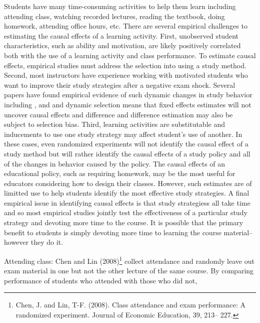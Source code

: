 \documentclass[12pt]{article}
\begin{document}
Students have many time-consuming activities to help them learn including attending class, watching recorded lectures, reading the textbook, doing homework, attending office hours, etc. There are several empirical challenges to estimating the causal effects of a learning activity. First, unobserved student characteristics, such as ability and motivation, are likely positively correlated both with the use of a learning activity and class performance. To estimate causal effects, empirical studies must address the selection into using a study method. Second, most instructors have experience working with motivated students who want to improve their study strategies after a negative exam shock. Several papers have found empirical evidence of such dynamic changes in study behavior including \textcite{oettinger2002}, \textcite{ss2008} and \textcite{cannon2011} and dynamic selection means that fixed effects estimates will not uncover causal effects and difference and difference estimation may also be subject to selection bias. Third, learning activities are substitutable and inducements to use one study strategy may affect student's use of another. In these cases, even randomized experiments will not identify the causal effect of a study method but will rather identify the causal effects of a study policy and all of the changes in behavior caused by the policy. The causal effects of an educational policy, such as requiring homework, may be the most useful for educators considering how to design their classes. However, such estimates are of limitted use to help students identify the most effective study strategies. A final empirical issue in identifying causal effects is that study strategiess all take time and so most empirical studies jointly test the effectiveness of a particular study strategy and devoting more time to the course. It is possible that the primary benefit to students is simply devoting more time to learning the course material--however they do it.

Attending class: Chen and Lin (2008)\footnote{Chen, J. and Lin, T-F. (2008). Class attendance and exam performance: A randomized experiment. Journal of Economic Education, 39, 213– 227.} collect attendance and randomly leave out exam material in one but not the other lecture of the same course. By comparing performance of students who attended with those who did not,
\end{document}
